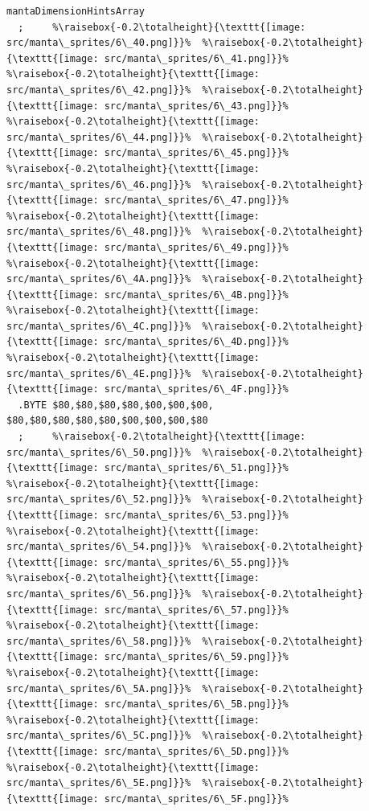 \begin{lstlisting}[escapechar=\%]
mantaDimensionHintsArray
  ;     %\raisebox{-0.2\totalheight}{\texttt{[image: src/manta\_sprites/6\_40.png]}}%  %\raisebox{-0.2\totalheight}{\texttt{[image: src/manta\_sprites/6\_41.png]}}%  %\raisebox{-0.2\totalheight}{\texttt{[image: src/manta\_sprites/6\_42.png]}}%  %\raisebox{-0.2\totalheight}{\texttt{[image: src/manta\_sprites/6\_43.png]}}%  %\raisebox{-0.2\totalheight}{\texttt{[image: src/manta\_sprites/6\_44.png]}}%  %\raisebox{-0.2\totalheight}{\texttt{[image: src/manta\_sprites/6\_45.png]}}%  %\raisebox{-0.2\totalheight}{\texttt{[image: src/manta\_sprites/6\_46.png]}}%  %\raisebox{-0.2\totalheight}{\texttt{[image: src/manta\_sprites/6\_47.png]}}%  %\raisebox{-0.2\totalheight}{\texttt{[image: src/manta\_sprites/6\_48.png]}}%  %\raisebox{-0.2\totalheight}{\texttt{[image: src/manta\_sprites/6\_49.png]}}%  %\raisebox{-0.2\totalheight}{\texttt{[image: src/manta\_sprites/6\_4A.png]}}%  %\raisebox{-0.2\totalheight}{\texttt{[image: src/manta\_sprites/6\_4B.png]}}%  %\raisebox{-0.2\totalheight}{\texttt{[image: src/manta\_sprites/6\_4C.png]}}%  %\raisebox{-0.2\totalheight}{\texttt{[image: src/manta\_sprites/6\_4D.png]}}%  %\raisebox{-0.2\totalheight}{\texttt{[image: src/manta\_sprites/6\_4E.png]}}%  %\raisebox{-0.2\totalheight}{\texttt{[image: src/manta\_sprites/6\_4F.png]}}%
  .BYTE $80,$80,$80,$80,$00,$00,$00, $80,$80,$80,$80,$80,$00,$00,$00,$80
  ;     %\raisebox{-0.2\totalheight}{\texttt{[image: src/manta\_sprites/6\_50.png]}}%  %\raisebox{-0.2\totalheight}{\texttt{[image: src/manta\_sprites/6\_51.png]}}%  %\raisebox{-0.2\totalheight}{\texttt{[image: src/manta\_sprites/6\_52.png]}}%  %\raisebox{-0.2\totalheight}{\texttt{[image: src/manta\_sprites/6\_53.png]}}%  %\raisebox{-0.2\totalheight}{\texttt{[image: src/manta\_sprites/6\_54.png]}}%  %\raisebox{-0.2\totalheight}{\texttt{[image: src/manta\_sprites/6\_55.png]}}%  %\raisebox{-0.2\totalheight}{\texttt{[image: src/manta\_sprites/6\_56.png]}}%  %\raisebox{-0.2\totalheight}{\texttt{[image: src/manta\_sprites/6\_57.png]}}%  %\raisebox{-0.2\totalheight}{\texttt{[image: src/manta\_sprites/6\_58.png]}}%  %\raisebox{-0.2\totalheight}{\texttt{[image: src/manta\_sprites/6\_59.png]}}%  %\raisebox{-0.2\totalheight}{\texttt{[image: src/manta\_sprites/6\_5A.png]}}%  %\raisebox{-0.2\totalheight}{\texttt{[image: src/manta\_sprites/6\_5B.png]}}%  %\raisebox{-0.2\totalheight}{\texttt{[image: src/manta\_sprites/6\_5C.png]}}%  %\raisebox{-0.2\totalheight}{\texttt{[image: src/manta\_sprites/6\_5D.png]}}%  %\raisebox{-0.2\totalheight}{\texttt{[image: src/manta\_sprites/6\_5E.png]}}%  %\raisebox{-0.2\totalheight}{\texttt{[image: src/manta\_sprites/6\_5F.png]}}%

\end{lstlisting}
